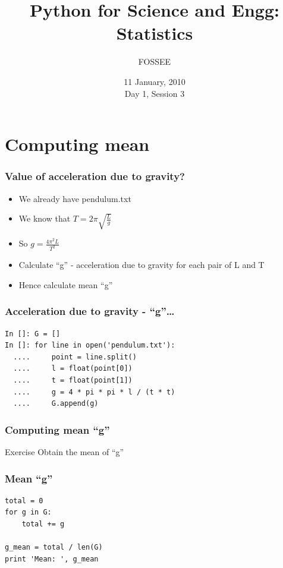 \documentclass[14pt,compress]{beamer}
\title[Statistics]{Python for Science and Engg: Statistics}
\author[FOSSEE] {FOSSEE}
\institute[IIT Bombay] {Department of Aerospace Engineering\\IIT Bombay}
\date[] {11 January, 2010\\Day 1, Session 3}
\begin{document}
\begin{frame}
  \maketitle
\end{frame}


\section{Computing mean}
\begin{frame}
  \frametitle{Value of acceleration due to gravity?}
  \begin{itemize}
    \item We already have pendulum.txt
    \item We know that $ T = 2\pi \sqrt{\frac{L}{g}} $
    \item So $ g = \frac{4 \pi^2 L}{T^2}  $
    \item Calculate ``g'' - acceleration due to gravity for each pair of L and T
    \item Hence calculate mean ``g''
  \end{itemize}
\end{frame}

\begin{frame}[fragile]
  \frametitle{Acceleration due to gravity - ``g''\ldots}
  \begin{lstlisting}
In []: G = []
In []: for line in open('pendulum.txt'):
  ....     point = line.split()
  ....     l = float(point[0])
  ....     t = float(point[1])
  ....     g = 4 * pi * pi * l / (t * t)
  ....     G.append(g)
  \end{lstlisting}
\end{frame}

\begin{frame}
  \frametitle{Computing mean ``g''}
  \begin{block}{Exercise}
    Obtain the mean of ``g''
  \end{block}
\end{frame}

\begin{frame}[fragile]
  \frametitle{Mean ``g''}
  \begin{lstlisting}
total = 0
for g in G:
    total += g

g_mean = total / len(G)
print 'Mean: ', g_mean
  \end{lstlisting}
\end{frame}
\end{document}
